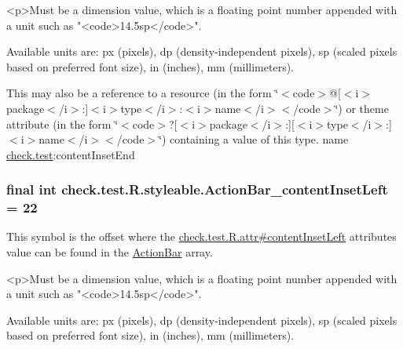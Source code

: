 \begin{DoxyVerb}      <p>Must be a dimension value, which is a floating point number appended with a unit such as "<code>14.5sp</code>".
\end{DoxyVerb}
 Available units are\+: px (pixels), dp (density-\/independent pixels), sp (scaled pixels based on preferred font size), in (inches), mm (millimeters). 

This may also be a reference to a resource (in the form \char`\"{}$<$code$>$@\mbox{[}$<$i$>$package$<$/i$>$\+:\mbox{]}$<$i$>$type$<$/i$>$\+:$<$i$>$name$<$/i$>$$<$/code$>$\char`\"{}) or theme attribute (in the form \char`\"{}$<$code$>$?\mbox{[}$<$i$>$package$<$/i$>$\+:\mbox{]}\mbox{[}$<$i$>$type$<$/i$>$\+:\mbox{]}$<$i$>$name$<$/i$>$$<$/code$>$\char`\"{}) containing a value of this type.  name \hyperlink{namespacecheck_1_1test}{check.\+test}\+:content\+Inset\+End \hypertarget{classcheck_1_1test_1_1_r_1_1styleable_af343f343d01cff19f5d4f79c6b1365d8}{}
\subsubsection[{Action\+Bar\+\_\+content\+Inset\+Left}]{\setlength{\rightskip}{0pt plus 5cm}final int check.\+test.\+R.\+styleable.\+Action\+Bar\+\_\+content\+Inset\+Left = 22\hspace{0.3cm}{\ttfamily [static]}}\label{classcheck_1_1test_1_1_r_1_1styleable_af343f343d01cff19f5d4f79c6b1365d8}
This symbol is the offset where the \hyperlink{classcheck_1_1test_1_1_r_1_1attr_a17f59061d06d3a375e4d728f01e99a9b}{check.\+test.\+R.\+attr\#content\+Inset\+Left} attribute\textquotesingle{}s value can be found in the \hyperlink{classcheck_1_1test_1_1_r_1_1styleable_ad0a4d403cb244ea4d22c6f6ebf2c2cdf}{Action\+Bar} array.

\begin{DoxyVerb}      <p>Must be a dimension value, which is a floating point number appended with a unit such as "<code>14.5sp</code>".
\end{DoxyVerb}
 Available units are\+: px (pixels), dp (density-\/independent pixels), sp (scaled pixels based on preferred font size), in (inches), mm (millimeters). 

